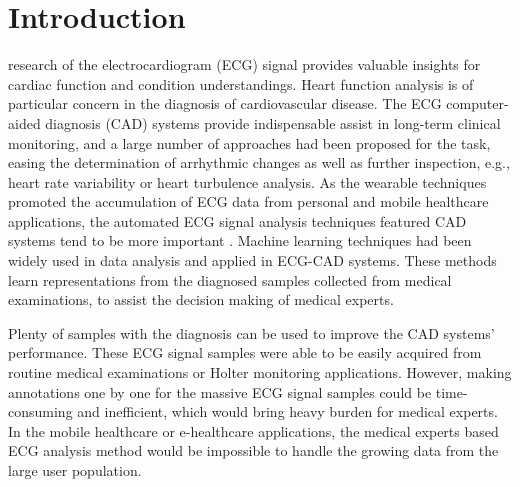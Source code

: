 \documentclass[journal]{IEEEtran}
\begin{document}
\section{Introduction}


% 
% 
% 
% 
 research of the electrocardiogram (ECG) signal provides valuable insights for cardiac function and condition understandings.
Heart function analysis is of particular concern in the diagnosis of cardiovascular disease. 
The ECG computer-aided diagnosis (CAD) systems provide indispensable assist in long-term clinical monitoring, and a large number of approaches had been proposed for the task, easing the determination of arrhythmic changes as well as further inspection, e.g., heart rate variability or heart turbulence analysis\cite{mar2011}. 
As the wearable techniques promoted the accumulation of ECG data from personal and mobile healthcare applications, the automated ECG signal analysis techniques featured CAD systems tend to be more important \cite{jankowski2003, winokur2013}.
Machine learning techniques had been widely used in data analysis and applied in ECG-CAD systems.
These methods learn representations from the diagnosed samples collected from medical examinations, to assist the decision making of medical experts.

Plenty of samples with the diagnosis can be used to improve the CAD systems' performance. 
These ECG signal samples were able to be easily acquired from routine medical examinations or Holter monitoring applications. 
However, making annotations one by one for the massive ECG signal samples could be time-consuming and inefficient, which would bring heavy burden for medical experts. 
In the mobile healthcare or e-healthcare applications, the medical experts based ECG analysis method would be impossible to handle the growing data from the large user population.
\end{document}
